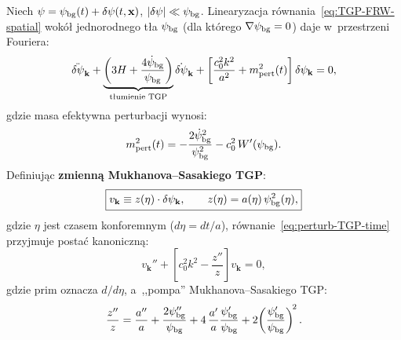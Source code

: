 \begin{proposition}\label{prop:MS-TGP}
Niech $\psi = \psi_{\rm bg}(t) + \delta\psi(t,\mathbf{x})$,
$|\delta\psi| \ll \psi_{\rm bg}$.
Linearyzacja r\'ownania~\eqref{eq:TGP-FRW-spatial}
wok\'o\l{} jednorodnego t\l{}a $\psi_{\rm bg}$ (dla kt\'orego
$\nabla\psi_{\rm bg} = 0$) daje w~przestrzeni Fouriera:
\begin{equation}\label{eq:perturb-TGP-time}
  \ddot{\delta\psi}_{\mathbf{k}}
  + \underbrace{\left(3H + \frac{4\dot\psi_{\rm bg}}{\psi_{\rm bg}}\right)}_{\text{t\l{}umienie TGP}}
    \dot{\delta\psi}_{\mathbf{k}}
  + \left[\frac{c_0^2 k^2}{a^2} + m_{\rm pert}^2(t)\right]
    \delta\psi_{\mathbf{k}} = 0,
\end{equation}
gdzie masa efektywna perturbacji wynosi:
\begin{equation}\label{eq:mpert-TGP}
  m_{\rm pert}^2(t)
  = -\frac{2\dot\psi_{\rm bg}^2}{\psi_{\rm bg}^2}
    - c_0^2\,W'(\psi_{\rm bg}).
\end{equation}
Definiuj\k{a}c \textbf{zmienn\k{a} Mukhanova--Sasakiego TGP}:
\begin{equation}\label{eq:MS-variable}
  \boxed{v_{\mathbf{k}} \equiv z(\eta)\cdot\delta\psi_{\mathbf{k}},
  \qquad z(\eta) = a(\eta)\,\psi_{\rm bg}^2(\eta),}
\end{equation}
gdzie $\eta$ jest czasem konforemnym ($d\eta = dt/a$),
r\'ownanie~\eqref{eq:perturb-TGP-time} przyjmuje posta\'c kanoniczn\k{a}:
\begin{equation}\label{eq:MS-TGP}
  \boxed{
    v_{\mathbf{k}}'' + \left[c_0^2 k^2 - \frac{z''}{z}\right]v_{\mathbf{k}} = 0,
  }
\end{equation}
gdzie prim oznacza $d/d\eta$, a~,,pompa'' Mukhanova--Sasakiego TGP:
\begin{equation}\label{eq:MS-pump}
  \frac{z''}{z}
  = \frac{a''}{a}
    + \frac{2\psi_{\rm bg}''}{\psi_{\rm bg}}
    + 4\,\frac{a'}{a}\frac{\psi_{\rm bg}'}{\psi_{\rm bg}}
    + 2\!\left(\frac{\psi_{\rm bg}'}{\psi_{\rm bg}}\right)^{\!2}.
\end{equation}
\end{proposition}

